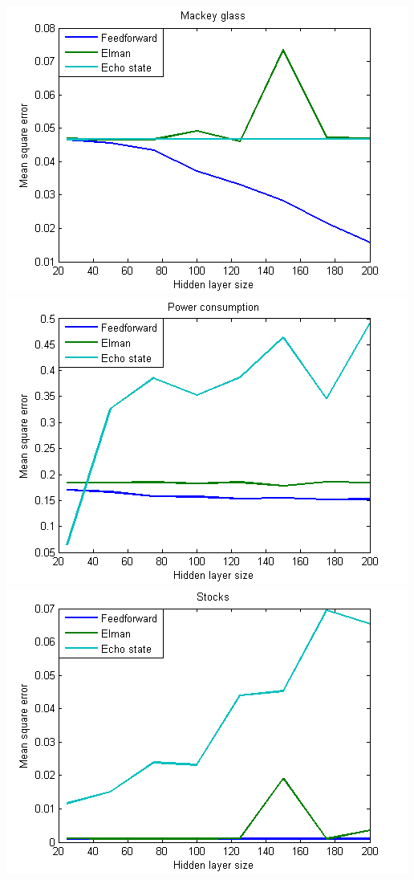 \documentclass{acm_proc_article-sp}
\begin{document}
\begin{center}
\includegraphics[scale=0.7]{mackey_plot.png}
\includegraphics[scale=0.7]{power_plot.png}
\includegraphics[scale=0.7]{stocks_plot.png}
\end{center}
\end{document}
